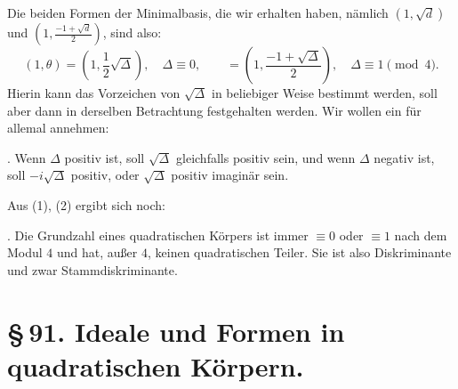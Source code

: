 \documentclass[11pt]{article}
\begin{document}
Die beiden Formen der Minimalbasis, die wir erhalten haben, nämlich $(1,\sqrt d)$ und $\left(1,\frac{-1+\sqrt d}{2}\right)$, sind also:
\begin{equation}
 (1,\theta)=\left(1,\frac12\sqrt\Delta\right),\quad \Delta\equiv0,\qquad
 =\left(1,\frac{-1+\sqrt\Delta}{2}\right),\quad \Delta\equiv1\pmod4.
\tag{9}
\end{equation}
Hierin kann das Vorzeichen von $\sqrt\Delta$ in beliebiger Weise bestimmt werden, soll aber dann in derselben Betrachtung festgehalten werden. Wir wollen ein für allemal annehmen:

\medskip
{}. Wenn $\Delta$ positiv ist, soll $\sqrt\Delta$ gleichfalls positiv sein, und wenn $\Delta$ negativ ist, soll $-i\sqrt\Delta$ positiv, oder $\sqrt\Delta$ positiv imaginär sein.
\medskip

Aus (1), (2) ergibt sich noch:

\medskip
{}. Die Grundzahl eines quadratischen Körpers ist immer $\equiv0$ oder $\equiv1$ nach dem Modul $4$ und hat, außer $4$, keinen quadratischen Teiler. Sie ist also Diskriminante und zwar Stammdiskriminante.


\section*{\S\,91. Ideale und Formen in quadratischen Körpern.}
\end{document}

